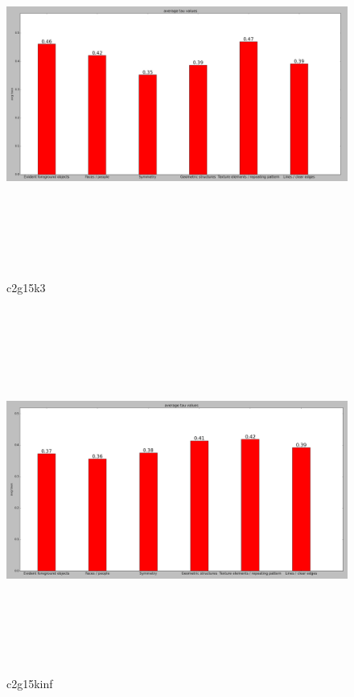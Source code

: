 		\begin{figure}[h] \label{c2g15k3}
			\includegraphics[width=\linewidth,height=12cm,keepaspectratio]{Figures/c2g15k3}
			\caption[c2g15k3]
			{c2g15k3}
		\end{figure}
		
		\begin{figure}[h] \label{c2g15kinf}
			\includegraphics[width=\linewidth,height=12cm,keepaspectratio]{Figures/c2g15kinf}
			\caption[c2g15kinf]
			{c2g15kinf}
		\end{figure}
